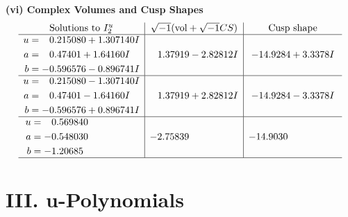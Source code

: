\documentclass[1p]{elsarticle_modified}
\theoremstyle{definition}
\newcommand{\I}{\sqrt{-1}}
\begin{document}
\newpage\flushleft \textbf{(vi) Complex Volumes and Cusp Shapes}
$$\begin{array}{c|c|c}  
\text{Solutions to }I^u_{2}& \I (\text{vol} + \sqrt{-1}CS) & \text{Cusp shape}\\
 \hline 
\begin{aligned}
u &= \phantom{-}0.215080 + 1.307140 I \\
a &= \phantom{-}0.47401 + 1.64160 I \\
b &= -0.596576 - 0.896741 I\end{aligned}
 & \phantom{-}1.37919 - 2.82812 I & -14.9284 + 3.3378 I \\ \hline\begin{aligned}
u &= \phantom{-}0.215080 - 1.307140 I \\
a &= \phantom{-}0.47401 - 1.64160 I \\
b &= -0.596576 + 0.896741 I\end{aligned}
 & \phantom{-}1.37919 + 2.82812 I & -14.9284 - 3.3378 I \\ \hline\begin{aligned}
u &= \phantom{-}0.569840\phantom{ +0.000000I} \\
a &= -0.548030\phantom{ +0.000000I} \\
b &= -1.20685\phantom{ +0.000000I}\end{aligned}
 & -2.75839\phantom{ +0.000000I} & -14.9030\phantom{ +0.000000I}\\
 \hline 
 \end{array}$$\newpage
\newpage\renewcommand{\arraystretch}{1}
\centering \section*{ III. u-Polynomials}
\end{document}
